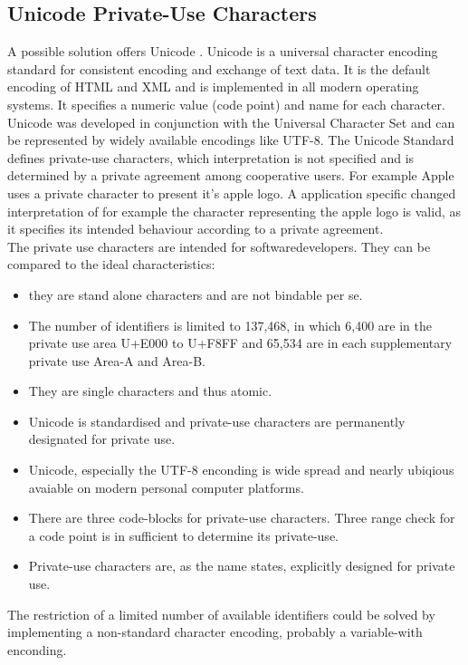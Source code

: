 \subsection{Unicode Private-Use Characters}
A possible solution offers Unicode \cite{Unicode}. Unicode is a universal character encoding standard for consistent encoding and exchange of text data. It is the default encoding of HTML and XML and is implemented in all modern operating systems. It specifies a numeric value (code point) and name for each character. Unicode was developed in conjunction with the Universal Character Set and can be represented by widely available encodings like UTF-8. The Unicode Standard defines private-use characters, which interpretation is not specified and is determined by a private agreement among cooperative users. For example Apple uses a private character to present it's apple logo. A application specific changed interpretation of for example the character representing the apple logo is valid, as it specifies its intended behaviour according to a private agreement.\\
The private use characters are intended for softwaredevelopers. They can be compared to the ideal characteristics:
\begin{itemize}
	\item they are stand alone characters and are not bindable per se.
	\item The number of identifiers is limited to 137,468, in which 6,400 are in the private use area U+E000 to U+F8FF and 65,534 are in each supplementary private use Area-A and Area-B. 
	\item They are single characters and thus atomic. 
	\item Unicode is standardised and private-use characters are permanently designated for private use.
	\item Unicode, especially the UTF-8 enconding is wide spread and nearly ubiqious avaiable on modern personal computer platforms.
	\item There are three code-blocks for private-use characters. Three range check for a code point is in sufficient to determine its private-use.
	\item Private-use characters are, as the name states, explicitly designed for private use.
\end{itemize}

The restriction of a limited number of available identifiers could be solved by implementing a non-standard character encoding, probably a variable-with enconding.


